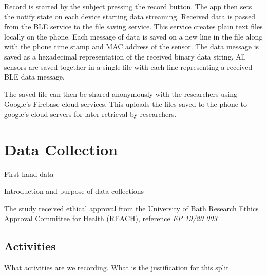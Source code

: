 Record is started by the subject pressing the record button. The app then sets the notify state on each device starting data streaming. Received data is passed from the BLE service to the file saving service. This service creates plain text files locally on the phone. Each message of data is saved on a new line in the file along with the phone time stamp and MAC address of the sensor. The data message is saved as a hexadecimal representation of the received binary data string. All sensors are saved together in a single file with each line representing a received BLE data message.

The saved file can then be shared anonymously with the researchers using Google's Firebase cloud services. This uploads the files saved to the phone to google's cloud servers for later retrieval by researchers.

\section{Data Collection}
\label{sec:methods-data-collection}
First hand data

Introduction and purpose of data collections

The study received ethical approval from the University of Bath Research Ethics Approval Committee for Health (REACH), reference \textit{EP 19/20 003}.

\subsection{Activities}
What activities are we recording. What is the justification for this split


